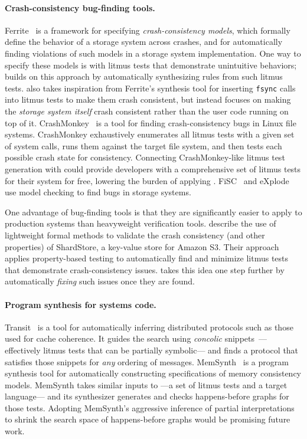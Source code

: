 \paragraph{Crash-consistency bug-finding tools.}
Ferrite~\cite{bornholt:ferrite} is a framework for specifying \emph{crash-consistency models},
which formally define the behavior of a storage system across crashes,
and for automatically finding violations of such models in a storage system implementation.
One way to specify these models is with litmus tests that demonstrate unintuitive behaviors;
\depsynth builds on this approach by automatically synthesizing rules from such litmus tests.
\depsynth also takes inspiration from Ferrite's synthesis tool
for inserting \texttt{fsync} calls into litmus tests to make them crash consistent,
but instead focuses on making the \emph{storage system itself} crash consistent
rather than the user code running on top of it.
CrashMonkey~\cite{mohan:crashmonkey} is a tool for finding crash-consistency bugs in Linux file systems.
CrashMonkey exhaustively enumerates all litmus tests with a given set of system calls,
runs them against the target file system,
and then tests each possible crash state for consistency.
Connecting CrashMonkey-like litmus test generation with \depsynth
could provide developers with a comprehensive set of litmus tests for their system for free,
lowering the burden of applying \depsynth.
FiSC~\cite{yang:fisc} and eXplode~\cite{yang:explode}
use model checking to find bugs in storage systems.

One advantage of bug-finding tools is that they are significantly easier to apply to production systems
than heavyweight verification tools.
\cite{bornholt:s3} describe the use of lightweight formal methods
to validate the crash consistency (and other properties)
of ShardStore, a key-value store for Amazon S3.
Their approach applies property-based testing to automatically find and minimize litmus tests
that demonstrate crash-consistency issues.
\depsynth takes this idea one step further by automatically \emph{fixing} such issues once they are found.

\paragraph{Program synthesis for systems code.}
Transit~\cite{udupa:transit} is a tool for automatically inferring distributed protocols
such as those used for cache coherence.
It guides the search using \emph{concolic} snippets~\cite{sen:concolic}---%
effectively litmus tests that can be partially symbolic---%
and finds a protocol that satisfies those snippets for \emph{any} ordering of messages.
MemSynth~\cite{bornholt:memsynth} is a program synthesis tool for
automatically constructing specifications of memory consistency models.
MemSynth takes similar inputs to \depsynth---a set of litmus tests and a target language---%
and its synthesizer generates and checks happens-before graphs for those tests.
Adopting MemSynth's aggressive inference of partial interpretations~\cite{torlak:kodkod}
to shrink the search space of happens-before graphs would be promising future work.

